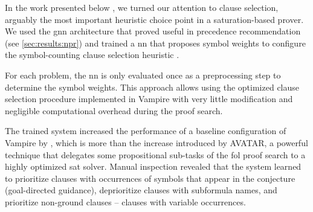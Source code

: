 



\label{sec:results:selection}

In the work presented below \cite{DBLP:conf/lpar/Bartek023},
we turned our attention to clause selection,
arguably the most important heuristic choice point in a saturation-based prover.
We used the \gls{gnn} architecture
that proved useful in precedence recommendation (see \cref{sec:results:npr})
and trained a \gls{nn} that proposes symbol weights to configure the symbol-counting clause selection heuristic \cite{DBLP:conf/cade/SchulzM16,E-manual}.

For each problem, the \gls{nn} is only evaluated once as a preprocessing step to determine the symbol weights.
This approach allows using the optimized clause selection procedure implemented in Vampire
with very little modification and negligible computational overhead during the proof search.

The trained system increased the performance of a baseline configuration of Vampire by ,
which is more than the increase introduced by AVATAR,
a powerful technique that delegates some propositional sub-tasks of the \gls{fol} proof search to a highly optimized \gls{sat} solver.
Manual inspection revealed that
the system learned to
prioritize clauses with occurrences of symbols that appear in the conjecture (goal-directed guidance),
deprioritize clauses with subformula names,
and prioritize non-ground clauses -- clauses with variable occurrences.

